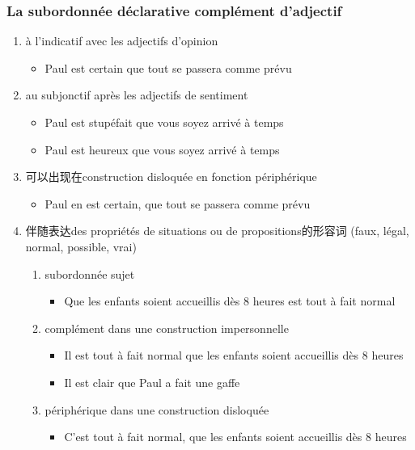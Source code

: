 \documentclass[UTF8]{report}
\begin{document}
\subsubsection{La subordonnée déclarative complément d’adjectif}

\begin{enumerate}
    \item à l’indicatif avec les adjectifs d’opinion
    \begin{itemize}
        \item Paul est certain que tout se passera comme prévu
    \end{itemize}
    \item au subjonctif après les adjectifs de sentiment 
    \begin{itemize}
        \item Paul est stupéfait que vous soyez arrivé à temps
        \item Paul est heureux que vous soyez arrivé à temps
    \end{itemize}
    \item 可以出现在construction disloquée en fonction périphérique 
    \begin{itemize}
        \item Paul en est certain, que tout se passera comme prévu
    \end{itemize}
    \item 伴随表达des propriétés de situations ou de propositions的形容词 (faux, légal, normal, possible, vrai)
    \begin{enumerate}
        \item subordonnée sujet 
        \begin{itemize}
            \item Que les enfants soient accueillis dès 8 heures est tout à fait normal
        \end{itemize}
        \item complément dans une construction impersonnelle
        \begin{itemize}
            \item Il est tout à fait normal que les enfants soient accueillis dès 8 heures
            \item Il est clair que Paul a fait une gaffe
        \end{itemize}
        \item périphérique dans une construction disloquée
        \begin{itemize}
            \item C’est tout à fait normal, que les enfants soient accueillis dès 8 heures

\end{itemize}
\end{enumerate}
\end{enumerate}
\end{document}
